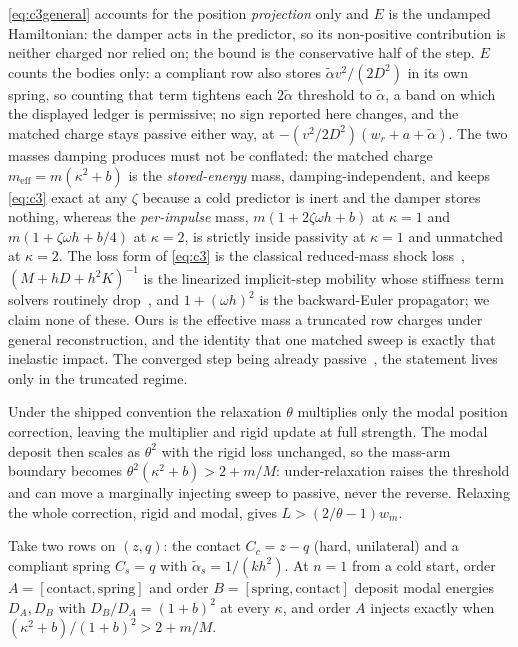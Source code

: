 \documentclass[sigconf,screen,review,anonymous]{acmart}
\newcommand{\Rr}{w_{r}}
\newcommand{\wm}{w_{m}}
\newcommand{\meff}{m_{\mathrm{eff}}}
\newcommand{\oh}{\omega h}
\theoremstyle{acmdefinition}
\begin{document}
\eqref{eq:c3general}
accounts for the position \emph{projection} only and $E$ is the undamped
Hamiltonian: the damper acts in the predictor, so its non-positive contribution
is neither charged nor relied on; the bound is the conservative half of the
step. $E$ counts the bodies only: a compliant row also stores
$\tilde\alpha v^2/(2D^2)$ in its own spring, so counting that term tightens
each $2\tilde\alpha$ threshold to $\tilde\alpha$, a band on which the displayed
ledger is permissive; no sign reported here changes, and the matched charge
stays passive either way, at $-(v^2/2D^2)(\Rr + a + \tilde\alpha)$.
The two masses damping produces must not be conflated: the matched
charge $\meff = m(\kappa^2 + b)$ is the \emph{stored-energy} mass,
damping-independent, and keeps \eqref{eq:c3} exact at any $\zeta$ because a cold
predictor is inert and the damper stores nothing, whereas the \emph{per-impulse}
mass, $m(1 + 2\zeta\oh + b)$ at $\kappa = 1$ and $m(1 + \zeta\oh + b/4)$ at
$\kappa = 2$, is strictly inside passivity at
$\kappa = 1$ and unmatched at $\kappa = 2$. The loss form of \eqref{eq:c3} is the
classical reduced-mass shock loss~\citep{moreau1985shocks},
$(M + hD + h^2 K)^{-1}$ is the linearized implicit-step mobility whose stiffness
term solvers routinely drop~\citep{tournier2015stable,andrewserleben2017geometric}, and
$1 + (\oh)^2$ is the backward-Euler propagator; we claim none of these. Ours is
the effective mass a truncated row charges under general reconstruction, and
the identity that one matched sweep is exactly that inelastic
impact. The converged step being already
passive~\citep{anitescu1997lcp}, the statement lives only in the truncated regime.

Under the shipped convention the relaxation $\theta$ multiplies only the
modal position correction, leaving the multiplier and rigid update at full
strength. The modal deposit then scales as $\theta^2$ with the rigid loss
unchanged, so the mass-arm boundary becomes $\theta^2(\kappa^2 + b) > 2 + m/M$:
under-relaxation raises the threshold and can move a marginally injecting sweep
to passive, never the reverse. Relaxing the whole correction, rigid and modal,
gives $L > (2/\theta - 1)\wm$.

\begin{proposition}
\label{prop:ordering}
Take two rows on $(z, q)$: the contact $C_c = z - q$ (hard, unilateral) and a
compliant spring $C_s = q$ with $\tilde\alpha_s = 1/(k h^2)$. At $n = 1$ from a
cold start, order $A = [\text{contact}, \text{spring}]$ and order $B =
[\text{spring}, \text{contact}]$ deposit modal energies $D_A, D_B$ with
$D_B/D_A = (1 + b)^2$ at every $\kappa$, and order $A$ injects exactly when
$(\kappa^2 + b)/(1+b)^2 > 2 + m/M$.
\end{proposition}
\end{document}
